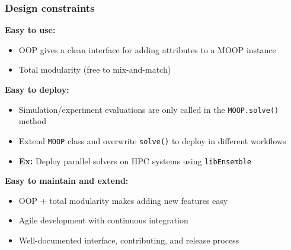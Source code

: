 \documentclass[aspectratio=169]{beamer}
\begin{document}
\begin{frame}
\begin{columns}
\begin{column}{0.2\textwidth}
\end{column}
\end{columns}
\end{frame}

\begin{frame}\frametitle{Design constraints}

\pause
{\bf Easy to use:}
\begin{itemize}
\item OOP gives a clean interface for adding attributes to a MOOP instance
\item Total modularity (free to mix-and-match)
\end{itemize}

\bigskip
\pause
{\bf Easy to deploy:}
\begin{itemize}
\item Simulation/experiment evaluations are only called in the
{\tt MOOP.solve()} method
\item Extend {\tt MOOP} class and overwrite {\tt solve()} to
deploy in different workflows
\item {\bf Ex:} Deploy parallel solvers on HPC systems using
{\tt libEnsemble}
\end{itemize}

\bigskip
\pause
{\bf Easy to maintain and extend:}
\begin{itemize}
\item OOP + total modularity makes adding new features easy
\item Agile development with continuous integration
\item Well-documented interface, contributing, and release process
\end{itemize}
\end{frame}
\end{document}
